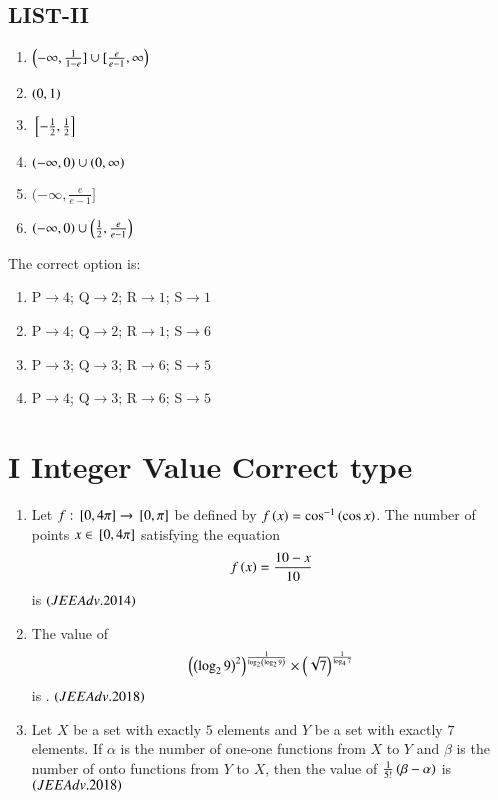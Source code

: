 \documentclass[journal,12pt,onecolumn,article]{IEEEtran}
\theoremstyle{remark}
\begin{document}
\begin{enumerate}
\begin{multicols}{2}
	\section*{LIST-II}
\begin{enumerate}
	\item $\left(-\infty,\frac{1}{1-e}]\cup[\frac{e}{e-1},\infty\right)$
	\item $\left(0,1\right)$
	\item ${}\left[-\frac{1}{2},\frac{1}{2}\right]$
	\item $\left(-\infty,0\right)\cup\left(0,\infty\right)$
	\item $(-\infty,\frac{e}{e-1}]$
	\item $\left(-\infty,0\right)\cup\left(\frac{1}{2},\frac{e}{e-1}\right)$
\end{enumerate}
\end{multicols}
The correct option is:
\begin{multicols}{2}
		\begin{enumerate}
		\item P$\to4$; Q$\to2$; R$\to1$; S$\to1$
		\item P$\to4$; Q$\to2$; R$\to1$; S$\to6$
	\columnbreak
		\item P$\to3$; Q$\to3$; R$\to6$; S$\to5$
		\item P$\to4$; Q$\to3$; R$\to6$; S$\to5$
	\end{enumerate}
\end{multicols}
\end{enumerate}
	    \section*{I Integer Value Correct type}
		   \begin{enumerate}
			   \item Let $f:{}\left[0,4\pi\right]\to{}\left[0,\pi\right]$ be defined by $f\left(x\right)=\cos^{-1}\left(\cos x\right)$. The number of points $x\in{}\left[0,4\pi\right]$ satisfying the equation 
				   \begin{align}
					   {f\ensuremath{\left(x\right)}=\frac{10-x}{10}}
				   \end{align}
				   is \hfill${\left(JEE Adv.2014\right)}$
			   \item The  value  of  
				   \begin{align}
					   \left(\left(\log_29\right)^2\right)^{\frac{1}{\log_2\left(\log_29\right)}}\times \left(\sqrt7\right)^{\frac{1}{\log_47}}
				   \end{align}
				   is .
				   \hfill${\left(JEEAdv.2018\right)}$
			   \item Let $X$ be a set with exactly $5$ elements and $Y$ be a set with exactly $7$ elements. If $\alpha$ is the number of one-one functions from $X$ to $Y$ and $\beta$ is the number of onto functions from $Y$ to $X$, then the value of $\frac{1}{5!}\left(\beta-\alpha\right)$ is ${\left(JEEAdv.2018\right)}$
		   \end{enumerate}
\end{document}
